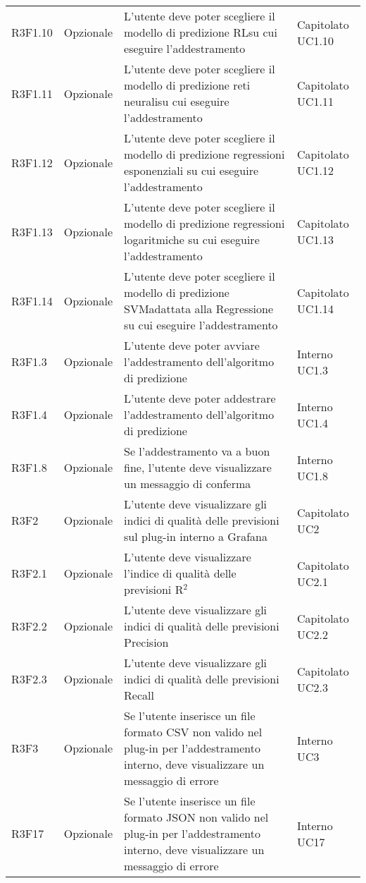\begin{longtable} {
		>{}p{24mm} 
		>{}p{32mm}
		>{}p{40mm} 
		>{}p{24.5mm}
		}
		R3F1.10 & Opzionale & L'utente deve poter scegliere il modello di predizione RL\glosp su cui eseguire l'addestramento & Capitolato UC1.10 \TBstrut \\ [2mm]
		R3F1.11 & Opzionale & L'utente deve poter scegliere il modello di predizione reti neurali\glosp su cui eseguire l'addestramento & Capitolato UC1.11 \TBstrut \\
		R3F1.12 & Opzionale & L'utente deve poter scegliere il modello di predizione regressioni esponenziali su cui eseguire l'addestramento & Capitolato UC1.12 \TBstrut \\
		R3F1.13 & Opzionale & L'utente deve poter scegliere il modello di predizione regressioni logaritmiche su cui eseguire l'addestramento & Capitolato UC1.13 \TBstrut \\
		R3F1.14 & Opzionale & L'utente deve poter scegliere il modello di predizione SVM\glosp adattata alla Regressione su cui eseguire l'addestramento & Capitolato UC1.14 \TBstrut \\
		R3F1.3 & Opzionale & L'utente deve poter avviare l'addestramento dell'algoritmo di predizione & Interno UC1.3 \TBstrut \\ [2mm]
		R3F1.4 & Opzionale & L'utente deve poter addestrare l'addestramento dell'algoritmo di predizione & Interno UC1.4 \TBstrut \\ [2mm]
		R3F1.8 & Opzionale & Se l'addestramento va a buon fine, l'utente deve visualizzare un messaggio di conferma & Interno UC1.8 \TBstrut \\ [2mm]		
		R3F2 & Opzionale & L'utente deve visualizzare gli indici di qualità delle previsioni sul plug-in interno a Grafana\glo & Capitolato UC2 \TBstrut \\ [2mm]
		R3F2.1 & Opzionale & L'utente deve visualizzare l'indice di qualità delle previsioni R$^{2}$\glo & Capitolato UC2.1 \TBstrut \\ [2mm]
		R3F2.2 & Opzionale & L'utente deve visualizzare gli indici di qualità delle previsioni Precision\glo & Capitolato UC2.2 \TBstrut \\ [2mm]
		R3F2.3 & Opzionale & L'utente deve visualizzare gli indici di qualità delle previsioni Recall\glo & Capitolato UC2.3 \TBstrut \\ [2mm]
		R3F3 & Opzionale & Se l'utente inserisce un file formato CSV non valido nel plug-in per l'addestramento interno, deve visualizzare un messaggio di errore & Interno UC3 \TBstrut \\ [2mm]
		R3F17 & Opzionale & Se l'utente inserisce un file formato JSON non valido nel plug-in per l'addestramento interno, deve visualizzare un messaggio di errore & Interno UC17 \TBstrut \\ [2mm]	

\end{longtable}
